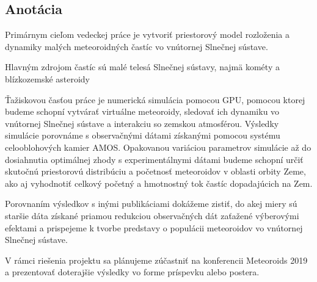 \subsection{Anotácia}\label{anotuxe1cia}

Primárnym cieľom vedeckej práce je vytvoriť priestorový model rozloženia
a dynamiky malých meteoroidných častíc vo vnútornej Slnečnej sústave.

Hlavným zdrojom častíc sú malé telesá Slnečnej sústavy, najmä kométy a
blízkozemské asteroidy

Ťažiskovou časťou práce je numerická simulácia pomocou GPU, pomocou
ktorej budeme schopní vytvárať virtuálne meteoroidy, sledovať ich
dynamiku vo vnútornej Slnečnej sústave a interakciu so zemskou
atmosférou. Výsledky simulácie porovnáme s observačnými dátami získanými
pomocou systému celooblohových kamier AMOS. Opakovanou variáciou
parametrov simulácie až do dosiahnutia optimálnej zhody s
experimentálnymi dátami budeme schopní určiť skutočnú priestorovú
distribúciu a početnosť meteoroidov v oblasti orbity Zeme, ako aj
vyhodnotiť celkový početný a hmotnostný tok častíc dopadajúcich na Zem.

Porovnaním výsledkov s inými publikáciami dokážeme zistiť, do akej miery
sú staršie dáta získané priamou redukciou observačných dát zaťažené
výberovými efektami a prispejeme k tvorbe predstavy o populácii
meteoroidov vo vnútornej Slnečnej sústave.

V rámci riešenia projektu sa plánujeme zúčastniť na konferencii
Meteoroids 2019 a prezentovať doterajšie výsledky vo forme príspevku
alebo postera.
